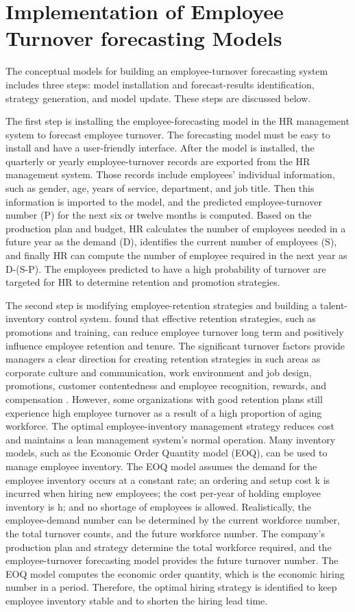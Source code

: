 \section{Implementation of Employee Turnover forecasting Models}

The conceptual models for building an employee-turnover forecasting system includes three steps: model installation and forecast-results identification, strategy generation, and model update.  These steps are discussed below.
 
The first step is installing the employee-forecasting model in the HR management system to forecast employee turnover. The forecasting model must be easy to install and have a user-friendly interface. After the model is installed, the quarterly or yearly employee-turnover records are exported from the HR management system. Those records include employees' individual information, such as gender, age, years of service, department, and job title. Then this information is imported to the model, and the predicted employee-turnover number (P) for the next six or twelve months is computed. Based on the production plan and budget, HR calculates the number of employees needed in a future year as the demand (D), identifies the current number of employees (S), and finally HR can compute the number of employee required in the next year as D-(S-P). The employees predicted to have a high probability of turnover are targeted for HR to determine retention and promotion strategies.  

The second step is modifying employee-retention strategies and building a talent-inventory control system. \citet{moncarz2009} found that effective retention strategies, such as promotions and training, can reduce employee turnover long term and positively influence employee retention and tenure. The significant turnover factors provide managers a clear direction for creating retention strategies in such areas as corporate culture and communication, work environment and job design, promotions, customer contentedness and employee recognition, rewards, and compensation \citep{moncarz2009}. However, some organizations with good retention plans still experience high employee turnover as a result of a high proportion of aging workforce. The optimal employee-inventory management strategy reduces cost and maintains a lean management system's normal operation. Many inventory models, such as the Economic Order Quantity model (EOQ), can be used to manage employee inventory. The EOQ model assumes the demand for the employee inventory occurs at a constant rate; an ordering and setup cost k is incurred when hiring new employees; the cost per-year of holding employee inventory is h; and no shortage of employees is allowed. Realistically, the employee-demand number can be determined by the current workforce number, the total turnover counts, and the future workforce number. The company's production plan and strategy determine the total workforce required, and the employee-turnover forecasting model provides the future turnover number. The EOQ model computes the economic order quantity, which is the economic hiring number in a period. Therefore, the optimal hiring strategy is identified to keep employee inventory stable and to shorten the hiring lead time. 

